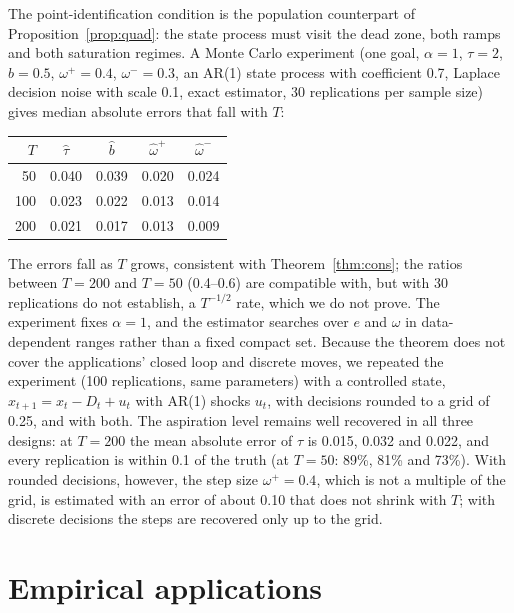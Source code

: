 \documentclass[pdflatex,sn-basic]{sn-jnl}
\theoremstyle{thmstyleone}\newtheorem{proposition}{Proposition}\newtheorem{theorem}{Theorem}
\theoremstyle{thmstylethree}\newtheorem{remark}{Remark}
\begin{document}
The point-identification condition is the population counterpart of Proposition~\ref{prop:quad}: the state process must visit the dead zone, both ramps and both saturation regimes. A Monte Carlo experiment (one goal, $\alpha=1$, $\tau=2$, $b=0.5$, $\omega^+=0.4$, $\omega^-=0.3$, an AR(1) state process with coefficient 0.7, Laplace decision noise with scale 0.1, exact estimator, 30 replications per sample size) gives median absolute errors that fall with $T$:
\begin{center}\small\begin{tabular}{rcccc}\toprule
$T$ & $\hat\tau$ & $\hat b$ & $\hat\omega^+$ & $\hat\omega^-$\\\midrule
50 & 0.040 & 0.039 & 0.020 & 0.024\\
100 & 0.023 & 0.022 & 0.013 & 0.014\\
200 & 0.021 & 0.017 & 0.013 & 0.009\\
\bottomrule\end{tabular}\end{center}
The errors fall as $T$ grows, consistent with Theorem~\ref{thm:cons}; the ratios between $T=200$ and $T=50$ (0.4--0.6) are compatible with, but with 30 replications do not establish, a $T^{-1/2}$ rate, which we do not prove. The experiment fixes $\alpha=1$, and the estimator searches over $e$ and $\omega$ in data-dependent ranges rather than a fixed compact set. Because the theorem does not cover the applications' closed loop and discrete moves, we repeated the experiment (100 replications, same parameters) with a controlled state, $x_{t+1}=x_t-D_t+u_t$ with AR(1) shocks $u_t$, with decisions rounded to a grid of 0.25, and with both. The aspiration level remains well recovered in all three designs: at $T=200$ the mean absolute error of $\tau$ is 0.015, 0.032 and 0.022, and every replication is within 0.1 of the truth (at $T=50$: 89\%, 81\% and 73\%). With rounded decisions, however, the step size $\omega^+=0.4$, which is not a multiple of the grid, is estimated with an error of about 0.10 that does not shrink with $T$; with discrete decisions the steps are recovered only up to the grid.

\section{Empirical applications}\label{sec:apps}
\end{document}
